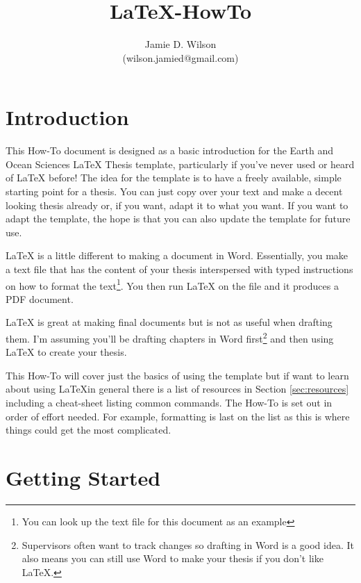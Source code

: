 \documentclass[11pt,a4paper,oneside]{article}
\author{Jamie D. Wilson \\ (wilson.jamied@gmail.com)}
\title{\LaTeX-HowTo}
\begin{document}
\maketitle

\begin{center}
\ccLogo \ccAttribution \ccShareAlike
\end{center}

\tableofcontents

\newpage

\section{Introduction}

This How-To document is designed as a basic introduction for the Earth and Ocean Sciences \LaTeX{} Thesis template, particularly if you've never used or heard of \LaTeX{} before! The idea for the template is to have a freely available, simple starting point for a thesis. You can just copy over your text and make a decent looking thesis already or, if you want, adapt it to what you want.  If you want to adapt the template, the hope is that you can also update the template for future use. 

\LaTeX{} is a little different to making a document in Word.  Essentially, you make a text file that has the content of your thesis interspersed with typed instructions on how to format the text\footnote{You can look up the text file for this document as an example}.  You then run \LaTeX{} on the file and it produces a PDF document. 

\LaTeX{} is great at making final documents but is not as useful when drafting them. I'm assuming you'll be drafting chapters in Word first\footnote{Supervisors often want to track changes so drafting in Word is a good idea.  It also means you can still use Word to make your thesis if you don't like \LaTeX.} and then using \LaTeX{} to create your thesis.

This How-To will cover just the basics of using the template but if want to learn about using \LaTeX in general there is a list of resources in Section \ref{sec:resources} including a cheat-sheet listing common commands.  The How-To is set out in order of effort needed.  For example, formatting is last on the list as this is where things could get the most complicated.

\section{Getting Started}
\end{document}
